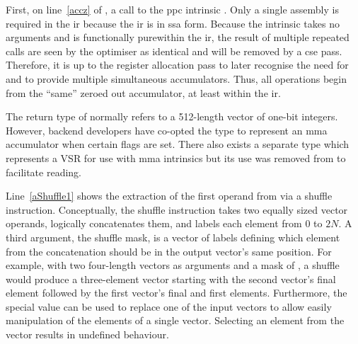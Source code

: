 \documentclass[\main/thesis.tex]{subfiles}
\begin{document}
First, on line~\ref{accz} of , a call to the \gls{ppc} \gls{intrinsic} \footnotemark.
Only a single assembly is required in the \gls{ir} because the \gls{ir} is in \gls{ssa} form.
Because the intrinsic takes no arguments and is functionally pure\footnotemark within the \gls{ir}, the result of multiple repeated calls are seen by the optimiser as identical and will be removed by a \gls{cse} pass.
Therefore, it is up to the register allocation pass to later recognise the need for and to provide multiple simultaneous accumulators.
Thus, all operations begin from the ``same'' zeroed out accumulator, at least within the \gls{ir}.

The  return type of  normally refers to a 512-length vector of one-bit integers.
However, backend developers have co-opted the type to represent an \gls{mma} accumulator when certain flags are set.
There also exists a separate type which represents a VSR for use with \gls{mma} \glspl{intrinsic} but its use was removed from  to facilitate reading\footnotemark.

Line~\ref{aShuffle1} shows the extraction of the first operand from  via a shuffle instruction.
Conceptually, the shuffle instruction takes two equally sized vector operands, logically concatenates them, and labels each element from $0$ to $2N$.
A third argument, the shuffle mask, is a vector of labels defining which element from the concatenation should be in the output vector's same position.
For example, with two four-length vectors as arguments and a mask of , a shuffle would produce a three-element vector starting with the second vector's final element followed by the first vector's final and first elements.
Furthermore, the special value  can be used to replace one of the input vectors to allow easily manipulation of the elements of a single vector.
Selecting an element from the  vector results in undefined behaviour.
\end{document}
